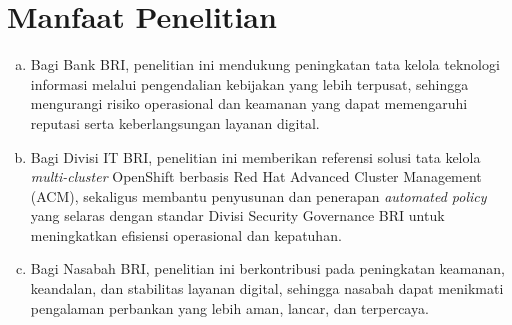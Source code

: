 \section{Manfaat Penelitian}

\begin{adjustwidth}{0.5cm}{0cm}
  \begin{enumerate}[a.]
    \item Bagi Bank BRI, penelitian ini mendukung peningkatan tata kelola teknologi informasi melalui pengendalian kebijakan yang lebih terpusat, sehingga mengurangi risiko operasional dan keamanan yang dapat memengaruhi reputasi serta keberlangsungan layanan digital.
    \item Bagi Divisi IT BRI, penelitian ini memberikan referensi solusi tata kelola \emph{multi-cluster} OpenShift berbasis Red Hat Advanced Cluster Management (ACM), sekaligus membantu penyusunan dan penerapan \emph{automated policy} yang selaras dengan standar Divisi Security Governance BRI untuk meningkatkan efisiensi operasional dan kepatuhan.
    \item Bagi Nasabah BRI, penelitian ini berkontribusi pada peningkatan keamanan, keandalan, dan stabilitas layanan digital, sehingga nasabah dapat menikmati pengalaman perbankan yang lebih aman, lancar, dan terpercaya.
  \end{enumerate}
\end{adjustwidth}